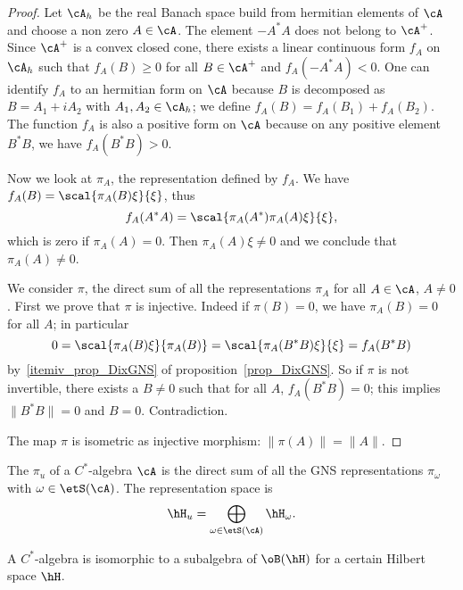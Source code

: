 \begin{proof}
Let $\cA_h$ be the real Banach space build from hermitian elements of $\cA$ and choose a non zero $A\in\cA$. The element $-A^*A$ does not belong to $\cA^+$. Since $\cA^+$ is a convex closed cone, there exists a linear continuous form $f_A$ on $\cA_h$ such that $f_A(B)\geq 0$ for all $B\in\cA^+$ and $f_A(-A^*A)<0$. One can identify $f_A$ to an hermitian form on $\cA$ because $B$ is decomposed as $B=A_1+iA_2$ with $A_1,A_2\in\cA_h$; we define $f_A(B)=f_A(B_1)+f_A(B_2)$. The function $f_A$ is also a positive form on $\cA$ because on any positive element $B^*B$, we have $f_A(B^*B)>0$.

Now we look at $\pi_A$, the representation defined by $f_A$. We have $f_A(B)=\scal{ \pi_A(B)\xi }{ \xi }$, thus
\[
  f_A(A^*A)=\scal{ \pi_A(A^*)\pi_A(A)\xi }{ \xi },
\]
which is zero if $\pi_A(A)=0$. Then $\pi_A(A)\xi\neq 0$ and we conclude that $\pi_A(A)\neq 0$.

We consider $\pi$, the direct sum of all the representations $\pi_A$ for all $A\in\cA$, $A\neq 0$. First we prove that $\pi$ is injective. Indeed if $\pi(B)=0$, we have $\pi_A(B)=0$ for all $A$; in particular
\begin{equation}
  0=\scal{ \pi_A(B)\xi }{ \pi_A(B) }
        =\scal{ \pi_A(B^*B)\xi }{ \xi }
        =f_A(B^*B)
\end{equation}
by~\ref{itemiv_prop_DixGNS} of proposition~\ref{prop_DixGNS}. So if $\pi$ is not invertible, there exists a $B\neq 0$ such that for all $A$, $f_A(B^*B)=0$; this implies $\| B^*B \|=0$ and $B=0$. Contradiction.

The map $\pi$ is isometric as injective morphism: $\| \pi(A) \|=\| A \|$.
\end{proof}


The  $\pi_u$ of a $C^*$-algebra $\cA$ is the direct sum of all the GNS representations $\pi_{\omega}$ with $\omega\in\etS(\cA)$. The representation space is
\[
  \hH_u=\bigoplus_{\omega\in\etS(\cA)}\hH_{\omega}.
\]


\begin{theorem}
A $C^*$-algebra is isomorphic to a subalgebra of $\oB(\hH)$ for a certain Hilbert space $\hH$.
\end{theorem}

